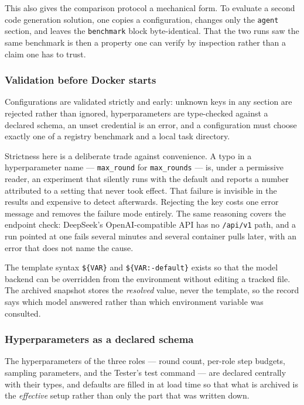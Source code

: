 This also gives the comparison protocol a mechanical form. To evaluate a second
code generation solution, one copies a configuration, changes only the
\texttt{agent} section, and leaves the \texttt{benchmark} block
byte-identical. That the two runs saw the same benchmark is then a property one
can verify by inspection rather than a claim one has to trust.

\subsubsection{Validation before Docker starts}

Configurations are validated strictly and early: unknown keys in any section
are rejected rather than ignored, hyperparameters are type-checked against a
declared schema, an unset credential is an error, and a configuration must
choose exactly one of a registry benchmark and a local task directory.

Strictness here is a deliberate trade against convenience. A typo in a
hyperparameter name --- \texttt{max\_round} for \texttt{max\_rounds} --- is,
under a permissive reader, an experiment that silently runs with the default
and reports a number attributed to a setting that never took effect. That
failure is invisible in the results and expensive to detect afterwards.
Rejecting the key costs one error message and removes the failure mode
entirely. The same reasoning covers the endpoint check: DeepSeek's
OpenAI-compatible API has no \texttt{/api/v1} path, and a run pointed at one
fails several minutes and several container pulls later, with an error that
does not name the cause.

The template syntax \texttt{\$\{VAR\}} and \texttt{\$\{VAR:-default\}} exists
so that the model backend can be overridden from the environment without
editing a tracked file. The archived snapshot stores the \emph{resolved} value,
never the template, so the record says which model answered rather than which
environment variable was consulted.

\subsubsection{Hyperparameters as a declared schema}

The hyperparameters of the three roles --- round count, per-role step budgets,
sampling parameters, and the Tester's test command --- are declared centrally
with their types, and defaults are filled in at load time so that what is
archived is the \emph{effective} setup rather than only the part that was
written down.

